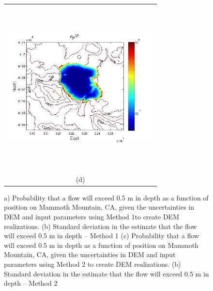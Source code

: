 \documentclass{article}
\begin{document}
\begin{figure}[H]
\begin{minipage}{0.6\textwidth}
\begin{tabular}{c}
	\includegraphics[width=8cm,height=9cm,keepaspectratio]{figs/Mammoth_3_sigma_5m.jpg}\\
        (d)
        \end{tabular}
    \end{minipage} 
\caption{a) Probability that a flow will exceed 0.5 m in depth as a function of position on Mammoth Mountain, CA, given the uncertainties in DEM and input parameters using Method 1to create DEM realizations. (b) Standard deviation in the estimate that the flow will exceed 0.5 m in depth -- Method 1
(c) Probability that a flow will exceed 0.5 m in depth as a function of position on Mammoth Mountain, CA, given the uncertainties in DEM and input parameters using  Method 2 to create DEM realizations.
(b) Standard deviation in the estimate that the flow will exceed 0.5 m in depth -- Method 2 }
\label{fig4}  
\end{figure}
\end{document}
